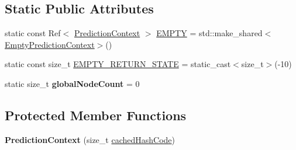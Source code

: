 \subsection*{Static Public Attributes}
\begin{DoxyCompactItemize}
\item 
static const Ref$<$ \hyperlink{classantlr4_1_1atn_1_1PredictionContext}{Prediction\+Context} $>$ \hyperlink{classantlr4_1_1atn_1_1PredictionContext_a274e7f1ed300832110b4f7b85e0dd1c4}{E\+M\+P\+TY} = std\+::make\+\_\+shared$<$\hyperlink{classantlr4_1_1atn_1_1EmptyPredictionContext}{Empty\+Prediction\+Context}$>$()
\item 
static const size\+\_\+t \hyperlink{classantlr4_1_1atn_1_1PredictionContext_af62e1e5dfe54ff75f0c361c62dd1910b}{E\+M\+P\+T\+Y\+\_\+\+R\+E\+T\+U\+R\+N\+\_\+\+S\+T\+A\+TE} = static\+\_\+cast$<$size\+\_\+t$>$(-\/10)
\item 
\mbox{\label{classantlr4_1_1atn_1_1PredictionContext_a5b37b6d275d527d552b66b266a0f781c}} 
static size\+\_\+t {\bfseries global\+Node\+Count} = 0
\end{DoxyCompactItemize}
\subsection*{Protected Member Functions}
\begin{DoxyCompactItemize}
\item 
\mbox{\label{classantlr4_1_1atn_1_1PredictionContext_a7da851951ad2232b4cfb314205d5b932}} 
{\bfseries Prediction\+Context} (size\+\_\+t \hyperlink{classantlr4_1_1atn_1_1PredictionContext_a2eb2612faaa082712dd779c13f588633}{cached\+Hash\+Code})
\end{DoxyCompactItemize}
